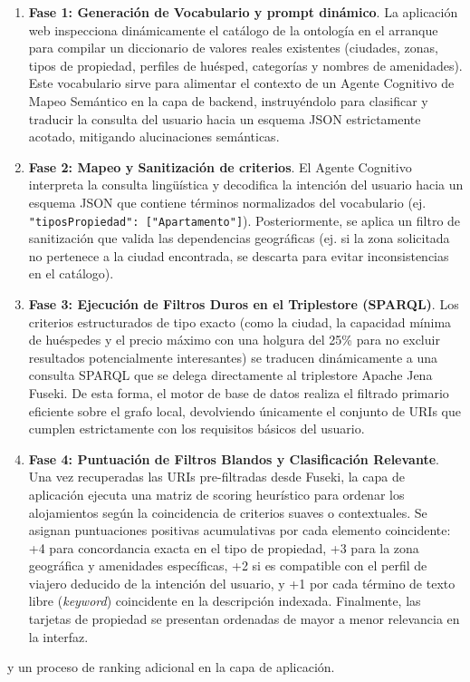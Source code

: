 \begin{enumerate}
  \item \textbf{Fase 1: Generación de Vocabulario y prompt dinámico}. La aplicación web inspecciona dinámicamente el catálogo de la ontología en el arranque para compilar un diccionario de valores reales existentes (ciudades, zonas, tipos de propiedad, perfiles de huésped, categorías y nombres de amenidades). Este vocabulario sirve para alimentar el contexto de un Agente Cognitivo de Mapeo Semántico en la capa de backend, instruyéndolo para clasificar y traducir la consulta del usuario hacia un esquema JSON estrictamente acotado, mitigando alucinaciones semánticas.
  
  \item \textbf{Fase 2: Mapeo y Sanitización de criterios}. El Agente Cognitivo interpreta la consulta lingüística y decodifica la intención del usuario hacia un esquema JSON que contiene términos normalizados del vocabulario (ej. \texttt{"tiposPropiedad": ["Apartamento"]}). Posteriormente, se aplica un filtro de sanitización que valida las dependencias geográficas (ej. si la zona solicitada no pertenece a la ciudad encontrada, se descarta para evitar inconsistencias en el catálogo).
  
  \item \textbf{Fase 3: Ejecución de Filtros Duros en el Triplestore (SPARQL)}. Los criterios estructurados de tipo exacto (como la ciudad, la capacidad mínima de huéspedes y el precio máximo con una holgura del 25\% para no excluir resultados potencialmente interesantes) se traducen dinámicamente a una consulta SPARQL que se delega directamente al triplestore Apache Jena Fuseki. De esta forma, el motor de base de datos realiza el filtrado primario eficiente sobre el grafo local, devolviendo únicamente el conjunto de URIs que cumplen estrictamente con los requisitos básicos del usuario.
  
  \item \textbf{Fase 4: Puntuación de Filtros Blandos y Clasificación Relevante}. Una vez recuperadas las URIs pre-filtradas desde Fuseki, la capa de aplicación ejecuta una matriz de scoring heurístico para ordenar los alojamientos según la coincidencia de criterios suaves o contextuales. Se asignan puntuaciones positivas acumulativas por cada elemento coincidente: +4 para concordancia exacta en el tipo de propiedad, +3 para la zona geográfica y amenidades específicas, +2 si es compatible con el perfil de viajero deducido de la intención del usuario, y +1 por cada término de texto libre (\textit{keyword}) coincidente en la descripción indexada. Finalmente, las tarjetas de propiedad se presentan ordenadas de mayor a menor relevancia en la interfaz.
\end{enumerate}
y un proceso de ranking adicional en la capa de aplicación.

